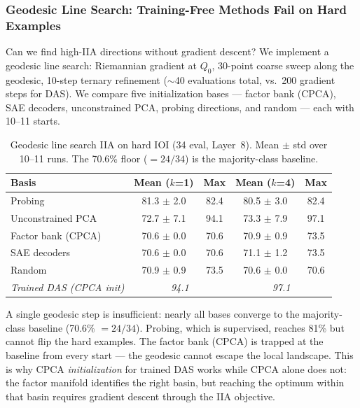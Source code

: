 \documentclass[11pt]{article}
\begin{document}
\subsubsection{Geodesic Line Search: Training-Free Methods Fail on Hard Examples}

Can we find high-IIA directions without gradient descent?
We implement a geodesic line search: Riemannian gradient at $Q_0$,
30-point coarse sweep along the geodesic, 10-step ternary refinement
($\sim$40 evaluations total, vs.\ 200 gradient steps for DAS).
We compare five initialization bases --- factor bank (CPCA), SAE decoders,
unconstrained PCA, probing directions, and random --- each with 10--11 starts.

\begin{table}[h!]
\centering
\small
\caption{Geodesic line search IIA on hard IOI (34 eval, Layer~8). Mean $\pm$ std over 10--11 runs. The 70.6\% floor ($= 24/34$) is the majority-class baseline.}
\label{tab:geodesic-5bases}
\begin{tabular}{lcccc}
\hline
\textbf{Basis} & \textbf{Mean ($k$=1)} & \textbf{Max} & \textbf{Mean ($k$=4)} & \textbf{Max} \\
\hline
Probing             & 81.3 $\pm$ 2.0 & 82.4 & 80.5 $\pm$ 3.0 & 82.4 \\
Unconstrained PCA   & 72.7 $\pm$ 7.1 & 94.1 & 73.3 $\pm$ 7.9 & 97.1 \\
Factor bank (CPCA)  & 70.6 $\pm$ 0.0 & 70.6 & 70.9 $\pm$ 0.9 & 73.5 \\
SAE decoders        & 70.6 $\pm$ 0.0 & 70.6 & 71.1 $\pm$ 1.2 & 73.5 \\
Random              & 70.9 $\pm$ 0.9 & 73.5 & 70.6 $\pm$ 0.0 & 70.6 \\
\hline
\textit{Trained DAS (CPCA init)}    & \multicolumn{2}{c}{\textit{94.1}} & \multicolumn{2}{c}{\textit{97.1}} \\
\hline
\end{tabular}
\end{table}

A single geodesic step is insufficient: nearly all bases converge to
the majority-class baseline (70.6\% $= 24/34$). Probing, which is
supervised, reaches 81\% but cannot flip the hard examples.
The factor bank (CPCA) is trapped at the baseline from every start ---
the geodesic cannot escape the local landscape.
This is why CPCA \emph{initialization} for trained DAS works while
CPCA alone does not: the factor manifold identifies the right basin,
but reaching the optimum within that basin requires gradient descent
through the IIA objective.
\end{document}

